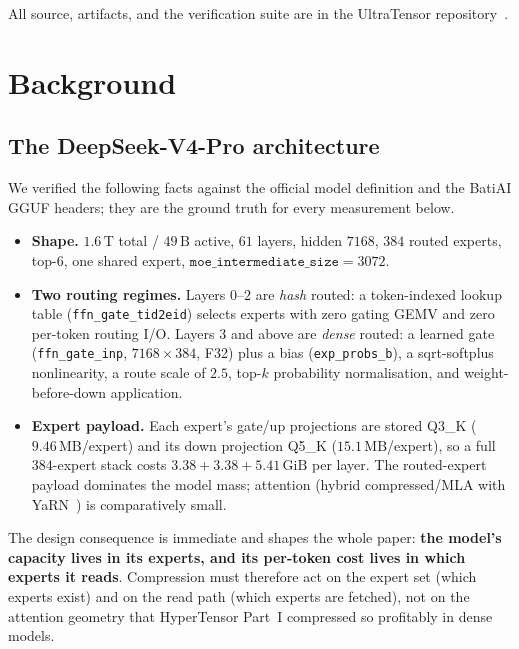 \documentclass[11pt]{article}
\newcommand{\code}[1]{\texttt{#1}}
\newcommand{\gib}{\,\textrm{GiB}}
\begin{document}
All source, artifacts, and the verification suite are in the UltraTensor
repository~\cite{ultratensor}.

\section{Background}
\label{sec:background}

\subsection{The DeepSeek-V4-Pro architecture}
\label{sec:arch}

We verified the following facts against the official model definition and the
BatiAI GGUF headers; they are the ground truth for every measurement below.

\begin{itemize}[leftmargin=1.4em]
  \item \textbf{Shape.} $1.6\,\textrm{T}$ total / $49\,\textrm{B}$ active,
    $61$ layers, hidden $7168$, $384$ routed experts, top-$6$, one shared
    expert, $\code{moe\_intermediate\_size}=3072$.
  \item \textbf{Two routing regimes.} Layers $0$--$2$ are \emph{hash} routed:
    a token-indexed lookup table (\code{ffn\_gate\_tid2eid}) selects experts
    with zero gating GEMV and zero per-token routing I/O. Layers $3$ and above
    are \emph{dense} routed: a learned gate (\code{ffn\_gate\_inp},
    $7168\times384$, F32) plus a bias (\code{exp\_probs\_b}), a sqrt-softplus
    nonlinearity, a route scale of $2.5$, top-$k$ probability normalisation,
    and weight-before-down application.
  \item \textbf{Expert payload.} Each expert's gate/up projections are stored
    Q3\_K ($9.46\,\textrm{MB}$/expert) and its down projection Q5\_K
    ($15.1\,\textrm{MB}$/expert), so a full $384$-expert stack costs
    $3.38+3.38+5.41\gib{}$ per layer. The routed-expert payload dominates the
    model mass; attention (hybrid compressed/MLA with YaRN~\cite{peng2024yarn})
    is comparatively small.
\end{itemize}

The design consequence is immediate and shapes the whole paper: \textbf{the
model's capacity lives in its experts, and its per-token cost lives in which
experts it reads}. Compression must therefore act on the expert set (which
experts exist) and on the read path (which experts are fetched), not on the
attention geometry that HyperTensor Part~I compressed so profitably in dense
models.
\end{document}
